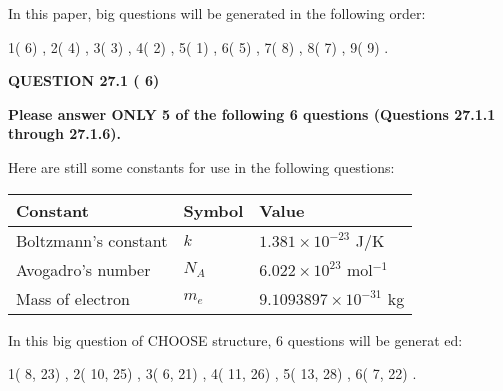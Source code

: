 \documentclass[12pt]{article}
\begin{document}
\vspace{0.3in}
 
 
   
   
   
\vspace{0.2in}
   
In this paper, big questions will be generated in the following order: 
   
   
            1(          6)
 ,
            2(          4)
 ,
            3(          3)
 ,
            4(          2)
 ,
            5(          1)
 ,
            6(          5)
 ,
            7(          8)
 ,
            8(          7)
 ,
            9(          9)
 .
  
\vspace{0.2in}
  
{\textbf{\Large{QUESTION
27.1 
 (          6)
}}}
  
  
 
{\textbf{\Large{Please answer ONLY
5 of the following
6 questions (Questions
27.1.1 through
27.1.6). }}}
 
Here are still some constants for use in the following questions:
 
 
\noindent\begin{tabular}{|l|l|l|}
\hline
Constant & Symbol & Value \\
\hline
 
Boltzmann's constant &
$k$ &
 $ 1.381 \times 10^{-23} $
J/K \\
\hline
 
Avogadro's number &
$N_A$ &
 $ 6.022 \times 10^{23} $
mol$^{-1}$ \\
\hline
 
Mass of electron &
$m_e$ &
 $ 9.1093897 \times 10^{-31} $
kg \\
\hline
 
\end{tabular}
 
   
\vspace{0.2in}
   
 In this big question of CHOOSE structure,           6 questions will be generat
 ed: 
  
  
            1(          8,         23)
 ,
            2(         10,         25)
 ,
            3(          6,         21)
 ,
            4(         11,         26)
 ,
            5(         13,         28)
 ,
            6(          7,         22)
 .
  
\vspace{0.2in}
  
\end{document}
